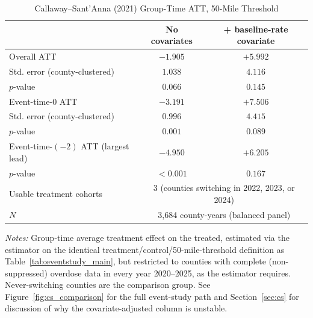 \begin{table}[htbp]
\centering
\caption{Callaway--Sant'Anna (2021) Group-Time ATT, 50-Mile Threshold}
\label{tab:cs_comparison}
\begin{tabular}{lcc}
\toprule
 & No covariates & + baseline-rate covariate \\
\midrule
Overall ATT             & $-1.905$ & $+5.992$ \\
Std. error (county-clustered) & $1.038$  & $4.116$ \\
$p$-value                & $0.066$  & $0.145$ \\
\addlinespace
Event-time-0 ATT         & $-3.191$ & $+7.506$ \\
Std. error (county-clustered) & $0.996$  & $4.415$ \\
$p$-value                & $0.001$  & $0.089$ \\
\addlinespace
Event-time-$(-2)$ ATT (largest lead) & $-4.950$ & $+6.205$ \\
$p$-value                & $<0.001$ & $0.167$ \\
\addlinespace
Usable treatment cohorts & \multicolumn{2}{c}{3 (counties switching in 2022, 2023, or 2024)} \\
$N$                       & \multicolumn{2}{c}{3{,}684 county-years (balanced panel)} \\
\bottomrule
\end{tabular}
\begin{minipage}{0.92\textwidth}
\vspace{0.3em}
\footnotesize
\textit{Notes:} Group-time average treatment effect on the treated, estimated via the \citet{CallawaySantAnna2021}
estimator on the identical treatment/control/50-mile-threshold definition as Table~\ref{tab:eventstudy_main}, but
restricted to counties with complete (non-suppressed) overdose data in every year 2020--2025, as the estimator
requires. Never-switching counties are the comparison group. See Figure~\ref{fig:cs_comparison} for the full
event-study path and Section~\ref{sec:cs} for discussion of why the covariate-adjusted column is unstable.
\end{minipage}
\end{table}
